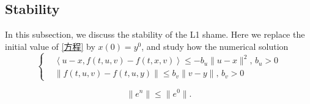 \subsection{Stability}
In this subsection, we discuss the stability of the L1 shame. Here we replace the initial value of \cref{方程} by $x(0)=y^0$, and study how the numerical solution 
\begin{equation*}
    \left\{
        \begin{aligned}
            &\left<u-x,f(t,u,v)-f(t,x,v)\right>\leqslant -b_u \|u-x\|^2,\,b_u>0
            \\ &\|f(t,u,v)-f(t,u,y)\|\leqslant b_v \|v-y\|,\,b_v>0
        \end{aligned}
    \right.
\end{equation*}
\begin{theorem}
    \begin{equation*}
        \|e^n\|\leqslant \|e^0\|.
    \end{equation*}
\end{theorem}
